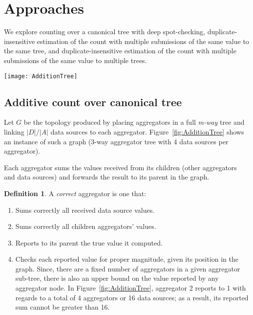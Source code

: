 \documentclass[11pt,twocolumn]{MyTightStyle}
\theoremstyle{plain}
\theoremstyle{definition}
\newtheorem{defn}{Definition}%
\theoremstyle{remark}
\numberwithin{equation}{section}
\begin{document}
\section{Approaches}

We explore counting over a canonical tree with deep spot-checking,
duplicate-insensitive estimation of the count with multiple submissions
of the same value to the same tree, and duplicate-insensitive estimation
of the count with multiple submissions of the same value to multiple
trees.

\begin{figure*}
\begin{center}
\texttt{[image: AdditionTree]}
\caption{\label{fig:AdditionTree} Circles are aggregators, squares are
data sources.}
\end{center}
\end{figure*}

\subsection{Additive count over canonical tree}
\label{sec:additionOverTree}
Let $G$ be the topology produced by placing aggregators in a full
\emph{m-way} tree and linking $|D|/|A|$ data sources to each aggregator.
Figure~\ref{fig:AdditionTree} shows an instance of such a graph (3-way
aggregator tree with 4 data sources per aggregator).

Each aggregator sums the values received from its children (other
aggregators and data sources) and forwards the result to its parent in
the graph.
\begin{defn}
A \emph{correct} aggregator is one that:
\begin{enumerate}
  \item Sums correctly all received data source values.
  \item Sums correctly all children aggregators' values.
  \item Reports to its parent the true value it computed.
  \item Checks each reported value for proper magnitude, given its
  position in the graph. Since, there are a fixed number of aggregators
  in a given aggregator sub-tree, there is also an upper bound on the
  value reported by any aggregator node.  In
  Figure~\ref{fig:AdditionTree}, aggregator 2 reports to 1 with regards
  to a total of 4 aggregators or 16 data sources; as a result, its
  reported sum cannot be greater than 16.
\end{enumerate}
\end{defn}
\end{document}
